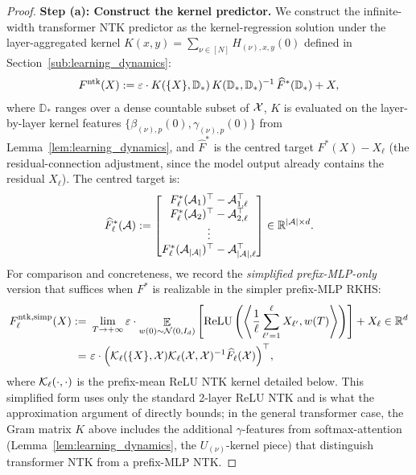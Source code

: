 \documentclass[11pt]{article}
\let\citet\citep
\theoremstyle{plain}
\newcommand{\wh}{\widehat}
\newcommand{\R}{\mathbb{R}}
\renewcommand{\hat}{\wh}
\DeclareMathOperator*{\E}{{\mathbb{E}}}
\begin{document}
\begin{proof}
    {\bf Step (a): Construct the kernel predictor.} We construct the infinite-width transformer NTK predictor as the kernel-regression solution under the layer-aggregated kernel $K(x,y) = \sum_{\nu\in[N]}H_{(\nu),x,y}(0)$ defined in Section~\ref{sub:learning_dynamics}:
    \begin{align*}
        F^{\rm ntk}(X) := \varepsilon \cdot K(\{X\},\mathbb{D}_*)\,K(\mathbb{D}_*,\mathbb{D}_*)^{-1}\,\hat F^*(\mathbb{D}_*) + X,
    \end{align*}
    where $\mathbb{D}_*$ ranges over a dense countable subset of ${\cal X}$, $K$ is evaluated on the layer-by-layer kernel features $\{\beta_{(\nu),p}(0), \gamma_{(\nu),p}(0)\}$ from Lemma~\ref{lem:learning_dynamics}, and $\hat F^*$ is the centred target $F^*(X) - X_\ell$ (the residual-connection adjustment, since the model output already contains the residual $X_\ell$). The centred target is:
    \begin{align*}
        \hat F^*_\ell({\cal A}) := \begin{bmatrix}
            F^*_\ell({\cal A}_{1})^\top - {\cal A}_{1, \ell}^\top \\
            F^*_\ell({\cal A}_{2})^\top - {\cal A}_{2, \ell}^\top \\
            \vdots \\
            F^*_\ell({\cal A}_{|{\cal A}|})^\top - {\cal A}_{|{\cal A}|, \ell}^\top
        \end{bmatrix} \in \R^{|{\cal A}| \times d}.
    \end{align*}
    For comparison and concreteness, we record the {\it simplified prefix-MLP-only} version that suffices when $F^*$ is realizable in the simpler prefix-MLP RKHS:
    \begin{align*}
        F_{\ell}^{\rm ntk,simp}(X) := & ~  \lim_{T \to +\infty} \varepsilon \cdot \E_{w(0) \sim {\cal N}(0, I_d)}\left[ {\rm ReLU} \left( \left\langle \frac{1}{\ell} \sum_{\ell'=1}^{\ell} X_{\ell'}, w(T) \right\rangle \right) \right] + X_{\ell} \in \R^d \\
        = & ~ \varepsilon \cdot \Big({\cal K}_{\ell}(\{ X\}, {\cal X}) {\cal K}_{\ell}({\cal X}, {\cal X})^{-1} \hat{F}_\ell({\cal X}) \Big)^\top,
    \end{align*}
    where ${\cal K}_\ell(\cdot,\cdot)$ is the prefix-mean ReLU NTK kernel detailed below. This simplified form uses only the standard 2-layer ReLU NTK and is what the approximation argument of \citet{adh+19} directly bounds; in the general transformer case, the Gram matrix $K$ above includes the additional $\gamma$-features from softmax-attention (Lemma~\ref{lem:learning_dynamics}, the $U_{(\nu)}$-kernel piece) that distinguish transformer NTK from a prefix-MLP NTK.

\end{proof}
\end{document}
